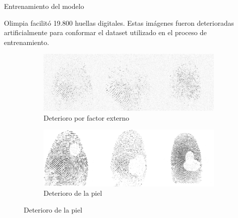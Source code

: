 \documentclass[12pt,aspectratio=169]{beamer}
\begin{document}
\begin{frame}{Entrenamiento del modelo}

    Olimpia facilitó 19.800 huellas digitales. Estas imágenes fueron deterioradas artificialmente para conformar el dataset utilizado en el proceso de entrenamiento.
    \vspace{5mm}

    \begin{figure}[h]
        \begin{subfigure}{0.48\textwidth}
            \centering
            \includegraphics[scale=0.24]{figs/deterioration_2.png}  
            \caption{Deterioro por factor externo}
        \end{subfigure}
        \begin{subfigure}{0.48\textwidth}
            \centering
            \includegraphics[scale=0.24]{figs/deterioration_1.png}  
            \caption{Deterioro de la piel}
        \end{subfigure}
    \end{figure}

\end{frame}
\end{document}
